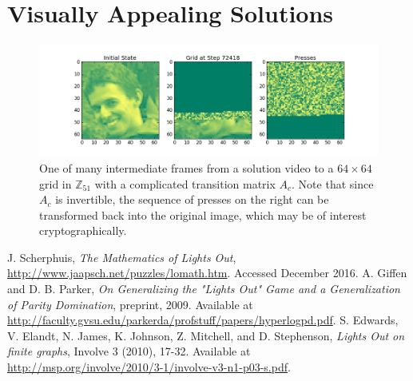 \documentclass[11pt]{article}
\newcommand{\modZ}[1]{$\mathbb{Z}_{#1}$}
\begin{document}
\section*{Visually Appealing Solutions}

\begin{figure}
  \caption{One of many intermediate frames from a solution video to a $64 \times 64$ grid in \modZ{51} with a complicated transition matrix $A_c$. Note that since $A_c$ is invertible, the sequence of presses on the right can be transformed back into the original image, which may be of interest cryptographically.}
  \label{chr-solution}
  \includegraphics[width=\textwidth]{img000072418.png}
\end{figure}

\clearpage

\begin{thebibliography}{9}
  J. Scherphuis, \textit{The Mathematics of Lights Out},
  \href{http://www.jaapsch.net/puzzles/lomath.htm}{http://www.jaapsch.net/puzzles/lomath.htm}.
  Accessed December 2016.
  A. Giffen and D. B. Parker, \textit{On Generalizing the "Lights Out" Game and a Generalization of Parity Domination}, preprint, 2009. Available at \href{http://faculty.gvsu.edu/parkerda/profstuff/papers/hyperlogpd.pdf}{http://faculty.gvsu.edu/parkerda/profstuff/papers/hyperlogpd.pdf}.
  S. Edwards, V. Elandt, N. James, K. Johnson, Z. Mitchell, and D. Stephenson, \textit{Lights Out on finite graphs}, Involve 3 (2010), 17-32. Available at \href{http://msp.org/involve/2010/3-1/involve-v3-n1-p03-s.pdf}{http://msp.org/involve/2010/3-1/involve-v3-n1-p03-s.pdf}.
\end{thebibliography}
\end{document}
